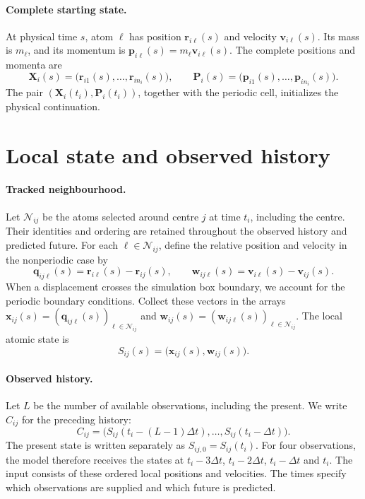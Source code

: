 \documentclass[11pt,a4paper]{article}
\newcommand{\x}{\mathbf x}
\newcommand{\X}{\mathbf X}
\newcommand{\Pp}{\mathbf P}
\begin{document}
\paragraph{Complete starting state.}
At physical time $s$, atom $\ell$ has position $\mathbf r_{i\ell}(s)$ and
velocity $\mathbf v_{i\ell}(s)$. Its mass is $m_\ell$, and its momentum is
$\mathbf p_{i\ell}(s)=m_\ell\mathbf v_{i\ell}(s)$. The complete positions
and momenta are
\[
\X_i(s)=\bigl(\mathbf r_{i1}(s),\ldots,\mathbf r_{in_i}(s)\bigr),
\qquad
\Pp_i(s)=\bigl(\mathbf p_{i1}(s),\ldots,\mathbf p_{in_i}(s)\bigr).
\]
The pair $(\X_i(t_i),\Pp_i(t_i))$, together with the periodic cell, initializes
the physical continuation.

\section{Local state and observed history}

\paragraph{Tracked neighbourhood.}
Let $\mathcal N_{ij}$ be the atoms selected around centre $j$ at time $t_i$,
including the centre. Their identities and ordering are retained throughout
the observed history and predicted future.
For each $\ell\in\mathcal N_{ij}$, define the relative position and velocity
in the nonperiodic case by
\[
\mathbf q_{ij\ell}(s)=\mathbf r_{i\ell}(s)-\mathbf r_{ij}(s),
\qquad
\mathbf w_{ij\ell}(s)=\mathbf v_{i\ell}(s)-\mathbf v_{ij}(s).
\]
When a displacement crosses the simulation box boundary, we account for the
periodic boundary conditions.
Collect these vectors in the arrays
$\x_{ij}(s)=(\mathbf q_{ij\ell}(s))_{\ell\in\mathcal N_{ij}}$ and
$\mathbf w_{ij}(s)=(\mathbf w_{ij\ell}(s))_{\ell\in\mathcal N_{ij}}$.
The local atomic state is
\[
\boxed{S_{ij}(s)=\bigl(\x_{ij}(s),\mathbf w_{ij}(s)\bigr).}
\]

\paragraph{Observed history.}
Let $L$ be the number of available observations, including the present.
We write $C_{ij}$ for the preceding history:
\[
C_{ij}=\bigl(S_{ij}(t_i-(L-1)\Delta t),\ldots,S_{ij}(t_i-\Delta t)\bigr).
\]
The present state is written separately as $S_{ij,0}=S_{ij}(t_i)$.
For four observations, the model therefore receives the states at
$t_i-3\Delta t$, $t_i-2\Delta t$, $t_i-\Delta t$ and $t_i$.
The input consists of these ordered local positions and velocities.
The times specify which observations are supplied and which future is predicted.
\end{document}

